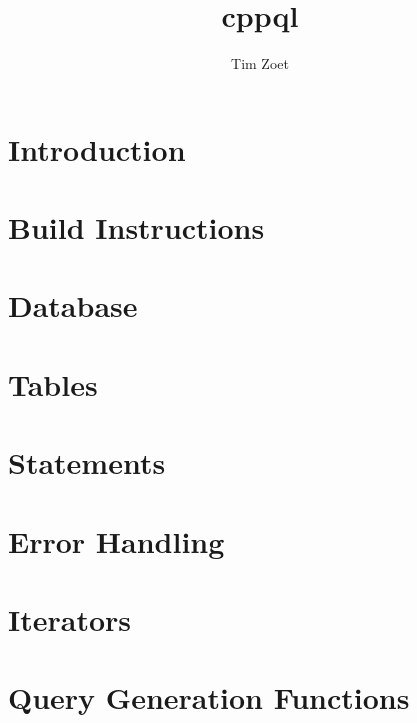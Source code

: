 \documentclass[twoside,a4paper,smallborder=true]{refart}
\title{cppql}
\author{Tim Zoet}
\date{}
\begin{document}
\maketitle

\tableofcontents
\newpage

\section{Introduction}
\label{section:introduction}

\newpage

\section{Build Instructions}
\label{section:build}

\newpage

\section{Database}
\label{section:database}

\newpage

\section{Tables}
\label{section:tables}

\newpage

\section{Statements}
\label{section:statements}

\newpage

\section{Error Handling}
\label{section:errors}
%
\newpage

\section{Iterators}
\label{section:iterators}
%
\newpage

\section{Query Generation Functions}
\label{section:gen}
%
\newpage

 
 
\printindex
\end{document}
